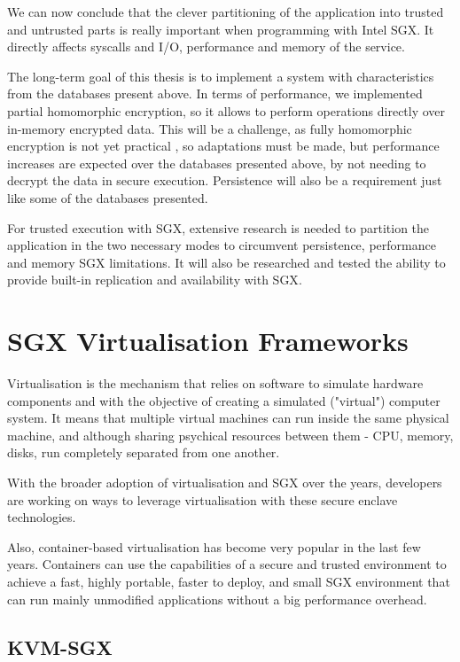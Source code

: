 We can now conclude that the clever partitioning of the application into trusted and untrusted parts is really important when programming with Intel \gls{SGX}. It directly affects \glspl{syscall} and \gls{I/O}, performance and memory of the service. 

The long-term goal of this thesis is to implement a system with characteristics from the databases present above. In terms of performance, we implemented partial homomorphic encryption, so it allows to perform operations directly over in-memory encrypted data. This will be a challenge, as fully homomorphic encryption is not yet practical \cite{homomorphic:1}, so adaptations must be made, but performance increases are expected over the databases presented above, by not needing to decrypt the data in secure execution. Persistence will also be a requirement just like some of the databases presented.

For trusted execution with \gls{SGX}, extensive research is needed to partition the application in the two necessary modes to circumvent persistence, performance and memory \gls{SGX} limitations. It will also be researched and tested the ability to provide built-in replication and availability with \gls{SGX}.

\section{SGX Virtualisation Frameworks}
\label{sec:sgx_virtualisation_frameworks}

Virtualisation is the mechanism that relies on software to simulate hardware components and with the objective of creating a simulated ("virtual") computer system. It means that multiple virtual machines can run inside the same physical machine, and although sharing psychical resources between them - CPU, memory, disks, run completely separated from one another.

With the broader adoption of virtualisation and \gls{SGX} over the years, developers are working on ways to leverage virtualisation with these secure enclave technologies.

Also, container-based virtualisation has become very popular in the last few years. Containers can use the capabilities of a secure and trusted environment to achieve a fast, highly portable, faster to deploy, and small \gls{SGX} environment that can run mainly unmodified applications without a big performance overhead.

\subsection{KVM-SGX}
\label{ssec:KVM-SGX}


